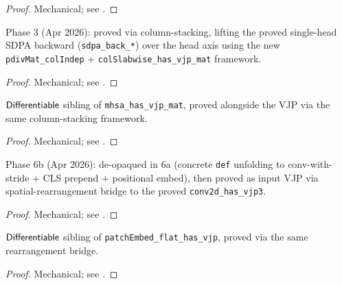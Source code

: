 \begin{proof}
\leanok
Mechanical; see .
\end{proof}

\begin{theorem}
  \label{ax:mhsa_has_vjp_mat}
  \leanok
  Phase 3 (Apr 2026): proved via column-stacking, lifting the
  proved single-head SDPA backward (\texttt{sdpa\_back\_*}) over
  the head axis using the new \texttt{pdivMat\_colIndep} +
  \texttt{colSlabwise\_has\_vjp\_mat} framework.
\end{theorem}

\begin{proof}
\leanok
Mechanical; see .
\end{proof}

\begin{theorem}
  \label{ax:mhsa_layer_flat_diff}
  \leanok
  \(\mathsf{Differentiable}\) sibling of \texttt{mhsa\_has\_vjp\_mat},
  proved alongside the VJP via the same column-stacking framework.
\end{theorem}

\begin{proof}
\leanok
Mechanical; see .
\end{proof}

\begin{theorem}
  \label{ax:patchEmbed_flat_has_vjp}
  \leanok
  Phase 6b (Apr 2026): de-opaqued in 6a (concrete \texttt{def}
  unfolding to conv-with-stride + CLS prepend + positional embed),
  then proved as input VJP via spatial-rearrangement bridge to the
  proved \texttt{conv2d\_has\_vjp3}.
\end{theorem}

\begin{proof}
\leanok
Mechanical; see .
\end{proof}

\begin{theorem}
  \label{ax:patchEmbed_flat_diff}
  \leanok
  \(\mathsf{Differentiable}\) sibling of
  \texttt{patchEmbed\_flat\_has\_vjp}, proved via the same
  rearrangement bridge.
\end{theorem}

\begin{proof}
\leanok
Mechanical; see .
\end{proof}

